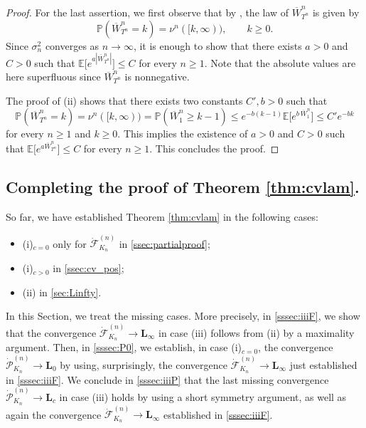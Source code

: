 \documentclass[AHL,XML,longabstracts,Unicode]{cedram}
\renewcommand{\P}{\mathbb{P}}
\newcommand{\E}{\mathbb{E}}
\def\dFKn{\dot{\mathcal{F}}^{(n)}_{K_{n}}}
\def\dPKn{\dot{\mathcal{P}}^{(n)}_{K_{n}}}
\renewcommand\Pr[1]{\mathbb{P}\left(#1\right)}
\begin{document}
\begin{proof}
For the last assertion, we first observe that by \cite[Lemma 1.9]{LG05}, the law of $\overline{W}^{n}_{T^{n}}$ is given by
\[\Pr{\overline{W}^{n}_{T^{n}}=k}=\nu^{n}([k,\infty)), \qquad k \geq 0.\]
Since $\sigma_{n}^{2}$ converges as $n \rightarrow \infty$,
it is enough to show that there exists $a>0$ and $C>0$
such that $\E\big[e^{a |\overline{W}^{n}_{T^{n}}|}\big] \leq C$ for every $n \geq 1$.
Note that the absolute values are here superfluous since $\overline{W}^{n}_{T^{n}}$
is nonnegative.

The proof of (ii) shows that there exists two constants $C',b>0$ such that
\[\Pr{\overline{W}^{n}_{T^{n}}=k}=\nu^{n}([k,\infty)) = \P(\overline{W}^{n}_{1} \geq k-1)  \leq e^{-b(k-1)} \E\big[ e^{b\, \overline{W}^{n}_1} \big]\le  C' e^{-bk}\]
for every $n \geq 1$ and $ k \geq 0$.
This implies the existence of $a>0$ and $C>0$ such that $\E\big[e^{a \overline{W}^{n}_{T^{n}}}\big] \leq C$ for every $n \geq 1$. This concludes the proof.
 \end{proof}


\subsection{Completing the proof of Theorem \ref{thm:cvlam}.} So far, we have established Theorem \ref{thm:cvlam} in the following cases:
\begin{itemize}
\item (i)$_{c=0}$ only for $ \dFKn$ in \cref{ssec:partialproof};
\item (i)$_{c>0}$ in \cref{ssec:cv_pos};
\item (ii) in \cref{sec:Linfty}.
\end{itemize}

In this Section, we treat the missing cases. More precisely, in \cref{sssec:iiiF}, we show that the convergence $\dFKn \rightarrow \mathbf{L}_{\infty}$  in case (iii)  follows from (ii) by a maximality argument. Then, in \cref{sssec:P0}, we establish, in case (i)$_{c=0}$, the  convergence $\dPKn \rightarrow \mathbf{L}_{0}$ by using, surprisingly, the convergence $ \dFKn \rightarrow \mathbf{L}_{\infty}$ just established in \cref{sssec:iiiF}. We conclude in \cref{sssec:iiiP} that   the last missing convergence $\dPKn \rightarrow \mathbf{L}_{c}$ in case (iii) holds by using a short symmetry argument,  as well as again the convergence $ \dFKn \rightarrow \mathbf{L}_{\infty}$  established in \cref{sssec:iiiF}.
\end{document}

